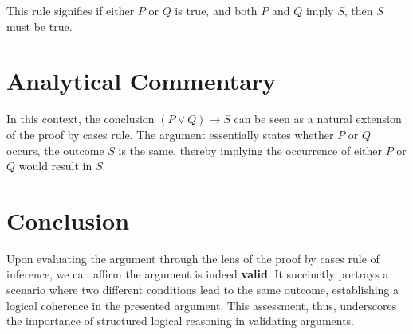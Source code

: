 \documentclass[12pt]{article}
\begin{document}
This rule signifies if either \( P \) or \( Q \) is true, and both \( P \) and \( Q \) imply \( S \), then \( S \) must be true.

\section*{Analytical Commentary}
In this context, the conclusion \( (P \lor Q) \rightarrow S \) can be seen as a natural extension of the proof by cases rule. The argument essentially states whether \( P \) or \( Q \) occurs, the outcome \( S \) is the same, thereby implying the occurrence of either \( P \) or \( Q \) would result in \( S \).

\section*{Conclusion}
Upon evaluating the argument through the lens of the proof by cases rule of inference, we can affirm the argument is indeed {\bf{valid}}. It succinctly portrays a scenario where two different conditions lead to the same outcome, establishing a logical coherence in the presented argument. This assessment, thus, underscores the importance of structured logical reasoning in validating arguments.
\end{document}
